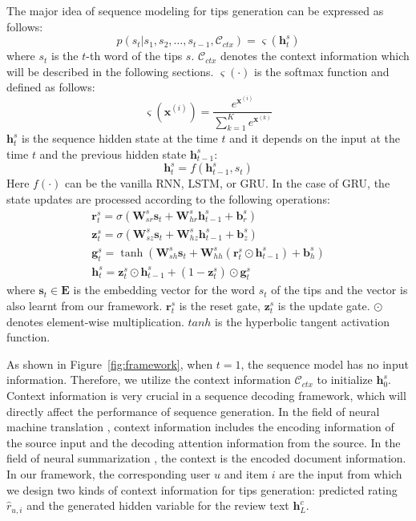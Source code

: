 \documentclass[sigconf]{acmart}
\begin{document}
The major idea of sequence modeling for tips generation can be expressed as follows:
\begin{equation}
p({s_t}|{s_1},{s_2}, \ldots ,{s_{t - 1}}, \mathcal{C}_{ctx}) = \varsigma (\mathbf{h}_t^s)
\end{equation}
where $s_t$ is the $t$-th word of the tips $s$.
$\mathcal{C}_{ctx}$ denotes the context information which will be described in the following sections.
$\varsigma(\cdot)$ is the softmax function and defined as follows:
\begin{equation}
\varsigma ({\mathbf{x}^{(i)}}) = \frac{{{e^{{\mathbf{x}^{(i)}}}}}}{{\sum\nolimits_{k = 1}^{K} {{e^{{\mathbf{x}^{(k)}}}}} }}
\label{eq:sfotmax}
\end{equation}
$\mathbf{h}_t^s$ is the sequence hidden state at the time $t$ and it depends on the input at the time $t$ and the previous hidden state  $\mathbf{h}_{t-1}^s$:
\begin{equation}
\mathbf{h}_{t}^s =  f(\mathbf{h}_{t-1}^s, s_{t})
\end{equation}
Here $f(\cdot)$ can be the vanilla RNN, LSTM, or GRU.
In the case of GRU, the state updates are processed according to the following operations:
\begin{equation}
\begin{array}{l}
\mathbf{r}_t^s = \sigma (\mathbf{W}_{sr}^s\mathbf{s}_t + \mathbf{W}_{hr}^s\mathbf{h}_{t - 1}^s + \mathbf{b}_r^s)\\
\mathbf{z}_t^s = \sigma (\mathbf{W}_{sz}^s\mathbf{s}_t + \mathbf{W}_{hz}^s\mathbf{h}_{t - 1}^s + \mathbf{b}_z^s)\\
\mathbf{g}_t^s = \tanh (\mathbf{W}_{sh}^s\mathbf{s}_t + \mathbf{W}_{hh}^s(\mathbf{r}_t^s \odot \mathbf{h}_{t - 1}^s) + \mathbf{b}_h^s)\\
\mathbf{h}_t^s = \mathbf{z}_t^s \odot \mathbf{h}_{t - 1}^s + (1 - \mathbf{z}_t^s) \odot \mathbf{g}_t^s
\end{array}
\label{eq:gru}
\end{equation}
where $\mathbf{s}_t \in \mathbf{E}$ is the embedding vector for the word $s_t$ of the tips and the vector is also learnt from our framework.
$\mathbf{r}_t^s$ is the reset gate, $\mathbf{z}_t^s$ is the update gate.
$\odot$ denotes element-wise multiplication. $tanh$ is the  hyperbolic tangent activation function.

As shown in Figure~\ref{fig:framework}, when $t=1$, the sequence model has no input information.
Therefore, we utilize the context information $\mathcal{C}_{ctx}$ to initialize $\mathbf{h}_{0}^s$.
Context information is very crucial in a sequence decoding framework, which will directly affect the performance of sequence generation.
In the field of neural machine translation \cite{wu2016google}, context information includes the encoding information of the source input and the decoding attention information from the source.
In the field of neural summarization \cite{rush2015neural,li2017salience}, the context is the encoded document information.
In our framework, the corresponding user $u$ and item $i$ are the input from which we design two kinds of context information for tips generation:
predicted rating $\hat r_{u,i}$ and the generated hidden variable for the review text $\mathbf{h}^c_L$.
\end{document}
